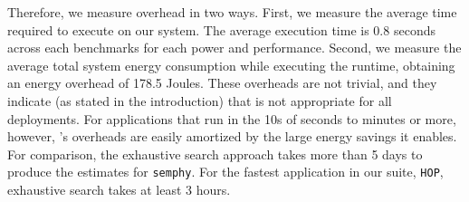 Therefore, we measure overhead in two ways.  First, we measure the
average time required to execute \SYSTEMLEO{} on our system.  The average
execution time is 0.8 seconds across each benchmarks for each power
and performance.   Second, we measure the
average total system energy consumption while executing the runtime,
obtaining an energy overhead of 178.5 Joules. These overheads are not
trivial, and they indicate (as stated in the introduction) that
\SYSTEMLEO{} is not appropriate for all deployments.  For applications
that run in the 10s of seconds to minutes or more, however,
\SYSTEMLEO{}'s overheads are easily amortized by the large energy savings
it enables.  For comparison, the exhaustive search approach takes more
than 5 days to produce the estimates for \texttt{semphy}.  For the
fastest application in our suite, \texttt{HOP}, exhaustive search
takes at least 3 hours.
